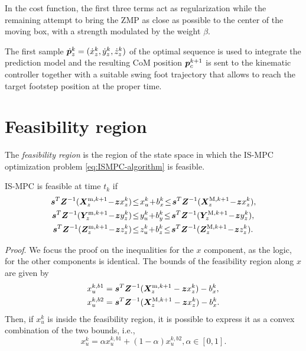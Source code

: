 In the cost function, the first three terms act as regularization while the remaining attempt to bring the ZMP as close as possible to the center of the moving box, with a strength modulated by the weight $\beta$.

The first sample $\dot {{\bm{p}}}_z^k = (\dot x_z^k, \dot y_z^k, \dot z_z^k)$ of the optimal sequence is used to integrate the prediction model and the resulting CoM position ${\bm{p}}_c^{k+1}$ is sent to the kinematic controller together with a suitable swing foot trajectory that allows to reach the target footstep position at the proper time.

\section{Feasibility region}

The {\em feasibility region} is the region of the state space in which the
IS-MPC optimization problem \eqref{eq:ISMPC-algorithm} is feasible.

\begin{proposition}
\label{prop:feasibility}
IS-MPC is feasible at time $t_k$ if
\begin{align}
\label{eq:FAPA:mpc-feasibility-constraint}
\bm{s}^T \bm{Z}^{-1} (\bm{X}_z^{{\rm m}, k+1} \!-\! \bm{z} x_z^k)  \!&\le\! x_u^k \!+\! b_x^k \!\le\! \bm{s}^T \bm{Z}^{-1} (\bm{X}_z^{{\rm M}, k+1} \!-\! \bm{z} x_z^k),
\nonumber\\
\bm{s}^T \bm{Z}^{-1} (\bm{Y}_z^{{\rm m}, k+1} \!-\! \bm{z} y_z^k)  \!&\le\! y_u^k \!+\! b_y^k \!\le\! \bm{s}^T \bm{Z}^{-1} (\bm{Y}_z^{{\rm M}, k+1} \!-\! \bm{z} y_z^k),
\nonumber\\
\bm{s}^T \bm{Z}^{-1} (\bm{Z}_z^{{\rm m}, k+1} \!-\! \bm{z} z_z^k)  \!&\le\! z_u^k \!+\! b_z^k \!\le\! \bm{s}^T \bm{Z}^{-1} (\bm{Z}_z^{{\rm M}, k+1} \!-\! \bm{z} z_z^k).
\end{align}
\end{proposition}
{\em Proof}.
We focus the proof on the inequalities for the $x$ component, as the logic, for the other components is identical. The bounds of the feasibility region along $x$ are given by
\begin{align*}
x_u^{k,b1} &= \bm{s}^T \bm{Z}^{-1} (\bm{X}_z^{{\rm m}, k+1} - \bm{z} x_z^k) - b_x^k, \\
x_u^{k,b2} &= \bm{s}^T \bm{Z}^{-1} (\bm{X}_z^{{\rm M}, k+1} - \bm{z} x_z^k) - b_x^k.
\end{align*}
Then, if $x_u^k$ is inside the feasibility region, it is possible to express it as a convex combination of the two bounds, i.e.,
\begin{equation}\label{eq:FAPA:xu_convex}
x_u^k = \alpha x_u^{k,b1} + (1-\alpha)x_u^{k,b2}, \alpha \in [0, 1].
\end{equation}

